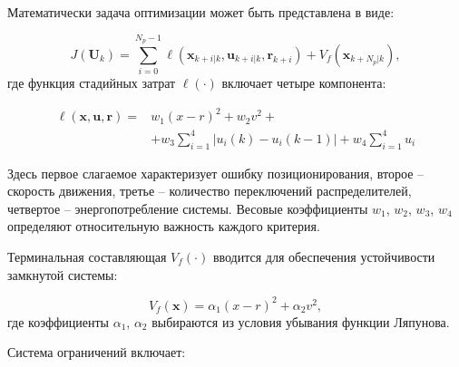 Математически задача оптимизации может быть представлена в виде:

\begin{equation}
	J(\mathbf{U}_k) = \sum_{i=0}^{N_p-1} \ell(\mathbf{x}_{k+i|k}, \mathbf{u}_{k+i|k}, \mathbf{r}_{k+i}) + V_f(\mathbf{x}_{k+N_p|k}),
\end{equation}
где функция стадийных затрат $\ell(\cdot)$ включает четыре компонента:

\begin{equation}
	\begin{aligned}
		\ell(\mathbf{x}, \mathbf{u}, \mathbf{r}) = & w_1(x - r)^2 + w_2v^2 +                                    \\
		                                           & + w_3\sum_{i=1}^4|u_i(k) - u_i(k-1)| + w_4\sum_{i=1}^4 u_i
	\end{aligned}
\end{equation}

Здесь первое слагаемое характеризует ошибку позиционирования, второе -- скорость движения, третье -- количество переключений распределителей,
четвертое -- энергопотребление системы. Весовые коэффициенты $w_1$, $w_2$, $w_3$, $w_4$ определяют относительную важность каждого критерия.

Терминальная составляющая $V_f(\cdot)$ вводится для обеспечения устойчивости замкнутой системы:

\begin{equation}
	V_f(\mathbf{x}) = \alpha_1(x - r)^2 + \alpha_2v^2,
\end{equation}
где коэффициенты $\alpha_1$, $\alpha_2$ выбираются из условия убывания функции Ляпунова.

Система ограничений включает:


